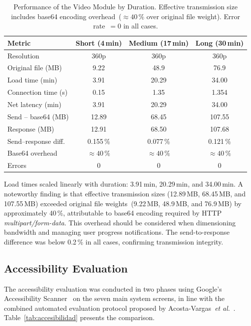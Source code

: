 \documentclass[journal]{IEEEtran}
\begin{document}
	\begin{table}[!t]
		\caption{Performance of the Video Module by Duration. Effective
			transmission size includes base64 encoding overhead~(${\approx}40\,\%$
			over original file weight). Error rate~$=0$ in all cases.}
		\label{tab:video}
		\centering
		\scriptsize
		\renewcommand{\arraystretch}{1.25}
		\begin{tabular}{lccc}
			\toprule
			\textbf{Metric} & \textbf{Short (4\,min)} & \textbf{Medium (17\,min)} & \textbf{Long (30\,min)} \\
			\midrule
			Resolution              & 360p    & 360p     & 360p     \\
			Original file (MB)      & 9.22    & 48.9     & 76.9     \\
			Load time (min)         & 3.91    & 20.29    & 34.00    \\
			Connection time (s)     & 0.15    & 1.35     & 1.354    \\
			Net latency (min)       & 3.91    & 20.29    & 34.00    \\
			Send -- base64 (MB)     & 12.89   & 68.45    & 107.55   \\
			Response (MB)           & 12.91   & 68.50    & 107.68   \\
			Send--response diff.    & 0.155\,\% & 0.077\,\% & 0.121\,\% \\
			Base64 overhead         & ${\approx}40\,\%$ & ${\approx}40\,\%$ & ${\approx}40\,\%$ \\
			Errors                  & 0       & 0        & 0        \\
			\bottomrule
		\end{tabular}
	\end{table}
	
	Load times scaled linearly with duration: 3.91\,min, 20.29\,min,
	and 34.00\,min.
	A noteworthy finding is that effective transmission sizes
	(12.89\,MB, 68.45\,MB, and 107.55\,MB) exceeded original file
	weights~(9.22\,MB, 48.9\,MB, and 76.9\,MB) by approximately
	40\,\%, attributable to base64 encoding required by HTTP
	\textit{multipart/form-data}.
	This overhead should be considered when dimensioning bandwidth
	and managing user progress notifications.
	The send-to-response difference was below 0.2\,\% in all cases,
	confirming transmission integrity.
	
	\subsection{Accessibility Evaluation}
	The accessibility evaluation was conducted in two phases using
	Google's Accessibility Scanner~\cite{acosta2021} on the seven
	main system screens, in line with the combined automated
	evaluation protocol proposed by
	Acosta-Vargas~\textit{et al.}~\cite{acosta2021}.
	Table~\ref{tab:accesibilidad} presents the comparison.
	
\end{document}
